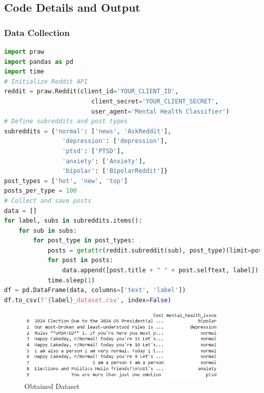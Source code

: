 \subsection{Code Details and Output}

\subsubsection{Data Collection}

\begin{tcolorbox}[colback=gray!5!white, colframe=gray!80!black, boxrule=0.5pt, title=Collecting Reddit Posts]
    \begin{lstlisting}[language=Python]
import praw
import pandas as pd
import time
# Initialize Reddit API
reddit = praw.Reddit(client_id='YOUR_CLIENT_ID',
                        client_secret='YOUR_CLIENT_SECRET',
                        user_agent='Mental Health Classifier')
# Define subreddits and post types
subreddits = {'normal': ['news', 'AskReddit'], 
                'depression': ['depression'], 
                'ptsd': ['PTSD'], 
                'anxiety': ['Anxiety'], 
                'bipolar': ['BipolarReddit']}
post_types = ['hot', 'new', 'top']
posts_per_type = 100
# Collect and save posts
data = []
for label, subs in subreddits.items():
    for sub in subs:
        for post_type in post_types:
            posts = getattr(reddit.subreddit(sub), post_type)(limit=posts_per_type)
            for post in posts:
                data.append([post.title + " " + post.selftext, label])
            time.sleep(1)
df = pd.DataFrame(data, columns=['text', 'label'])
df.to_csv(f'{label}_dataset.csv', index=False)
    \end{lstlisting}
    \end{tcolorbox}
    
    \begin{figure}[h!]  
        \centering
        \includegraphics[width=0.9\textwidth]{Images/Dataset.png}  
        \caption{Obtained Dataset}
        \label{LSTMROC711}  %
    \end{figure}


